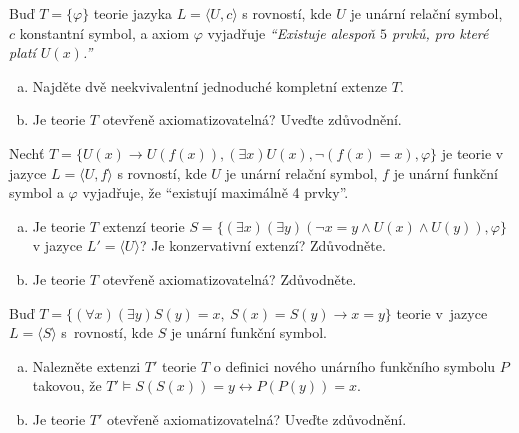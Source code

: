 \begin{problem}

    Buď $T=\{\varphi\}$ teorie jazyka $L=\langle U, c \rangle$ s rovností, kde $U$ je unární relační symbol, $c$ konstantní symbol, a axiom $\varphi$ vyjadřuje \emph{``Existuje alespoň $5$ prvků, pro které platí $U(x)$.''}
    \begin{enumerate}[(a)]
        \item Najděte dvě neekvivalentní jednoduché kompletní extenze $T$.
        \item Je teorie $T$ otevřeně axiomatizovatelná? Uveďte zdůvodnění.
    \end{enumerate}

\end{problem}


\begin{problem}

    Nechť $T = \{U(x) \to U(f(x)), (\exists x)U(x), \neg (f(x) = x), \varphi\}$ je teorie v jazyce $L = \langle U, f \rangle$ s rovností, kde $U$ je unární relační symbol, $f$ je unární funkční symbol a $\varphi$ vyjadřuje, že ``existují maximálně 4 prvky''.
    \begin{enumerate}[(a)]
        \item Je teorie $T$ extenzí teorie $S = \{ (\exists x)(\exists y)(\neg x = y \land U(x) \land U(y)), \varphi \}$ v jazyce $L' = \langle U \rangle$? Je konzervativní extenzí? Zdůvodněte.
        \item Je teorie $T$ otevřeně axiomatizovatelná? Zdůvodněte.    
    \end{enumerate}
\end{problem}


\begin{problem}

    Buď $T=\{(\forall x)(\exists y) S(y)=x,\ S(x)=S(y)\to x=y\}$ teorie v~jazyce $L=\langle S\rangle$ s~rovností, kde $S$ je unární funkční symbol.
    \begin{enumerate}[(a)]
        \item Nalezněte extenzi $T'$ teorie $T$ o definici nového unárního funkčního symbolu $P$ takovou, že $T' \models S(S(x))=y \leftrightarrow P(P(y))=x$.
        \item Je teorie $T'$ otevřeně axiomatizovatelná? Uveďte zdůvodnění.
    \end{enumerate}

\end{problem} 



